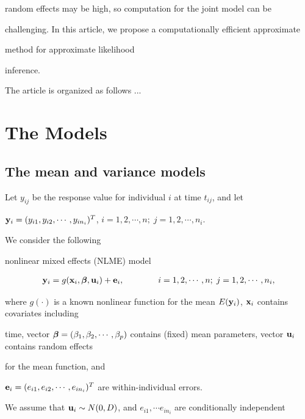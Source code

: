 \documentclass[12pt]{article}
\newcommand{\bbeta}{\mbox{\boldmath $\beta$}}
\begin{document}
random effects may be high, so computation for the joint model can be 

challenging. In this article, we propose a computationally efficient approximate 

method for approximate likelihood 

inference. 



    The article is organized as follows ...







\section{The Models}



\subsection{The mean and variance models}



      Let $y_{ij}$ be the response value for individual $i$ at time $t_{ij}$, and let 

 ${\bf y}_i = (y_{i1}, y_{i2}, \cdots, y_{in_i})^T$,  $i=1,2,\cdots,n; \; j=1,2,\cdots,n_i$.  

We consider the following 

nonlinear mixed effects (NLME) model

\begin{eqnarray}

     {\bf y}_i = g({\bf x}_i, \bbeta, {\bf u}_i) + {\bf e}_i, \qquad\qquad i=1,2,\cdots,n; \;

j=1,2,\cdots,n_i,   \label{nlme}

\end{eqnarray}

where $g(\cdot)$ is a known nonlinear function for the mean $E({\bf y}_i)$, ${\bf x}_i$ contains covariates including 

time, vector $\bbeta = (\beta_1,\beta_2, \cdots, \beta_p)$ contains (fixed) mean parameters, vector ${\bf u}_i$ contains random effects 

for the mean function, and 

 ${\bf e}_i = (e_{i1}, e_{i2}, \cdots, e_{in_i})^T$ are within-individual errors. 

We assume that ${\bf u}_i \sim N(0, D)$, and $e_{i1}, \cdots e_{in_i} $ are conditionally independent 
\end{document}
